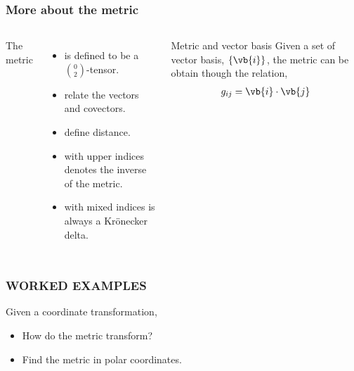\begin{frame}
  \frametitle{More about the metric}
  \begin{columns}[t]
    The metric
    \begin{itemize}
    \item  is defined to be a $\binom{0}{2}$-tensor.
    \item relate the vectors and covectors.
    \item define distance.
    \item with upper indices denotes the inverse of the metric.
    \item with mixed indices is \alert{always} a Kr\"onecker delta.
    \end{itemize}
    \begin{block}{Metric and vector basis}
      Given a set of vector basis, $\{\vb{i}\}$, the metric can be obtain though the relation,
      \begin{align*}
        g_{i j} = \vb{i}\cdot \vb{j}
      \end{align*}
    \end{block}
  \end{columns}
\end{frame}

{
\begin{frame}
  \frametitle{\alert{WORKED EXAMPLES}}
  Given a coordinate transformation, 
  \begin{itemize}
  \item How do the metric transform?
  \item Find the metric in polar coordinates.
  \end{itemize}
\end{frame}
}

